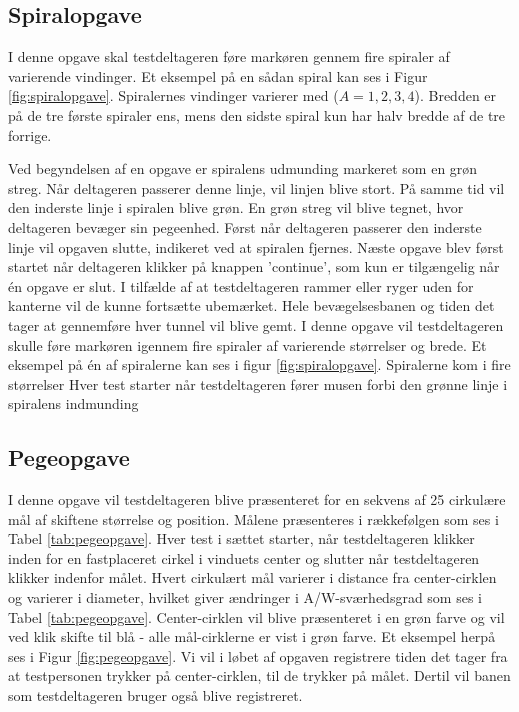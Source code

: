 \subsection*{Spiralopgave}
I denne opgave skal testdeltageren føre markøren gennem fire spiraler af varierende vindinger. Et eksempel på en sådan spiral kan ses i Figur \ref{fig:spiralopgave}. Spiralernes vindinger varierer med ($A = 1, 2, 3, 4$). Bredden er på de tre første spiraler ens, mens den sidste spiral kun har halv bredde af de tre forrige.

Ved begyndelsen af en opgave er spiralens udmunding markeret som en grøn streg. Når deltageren passerer denne linje, vil linjen blive stort. På samme tid vil den inderste linje i spiralen blive grøn. En grøn streg vil blive tegnet, hvor deltageren bevæger sin pegeenhed. Først når deltageren passerer den inderste linje vil opgaven slutte, indikeret ved at spiralen fjernes. Næste opgave blev først startet når deltageren klikker på knappen 'continue', som kun er tilgængelig når én opgave er slut. I tilfælde af at testdeltageren rammer eller ryger uden for kanterne vil de kunne fortsætte ubemærket. Hele bevægelsesbanen og tiden det tager at gennemføre hver tunnel vil blive gemt.
I denne opgave vil testdeltageren skulle føre markøren igennem fire spiraler af varierende størrelser og brede. Et eksempel på én af spiralerne kan ses i figur \ref{fig:spiralopgave}. Spiralerne kom i fire størrelser Hver test starter når testdeltageren fører musen forbi den grønne linje i spiralens indmunding

\subsection*{Pegeopgave}
I denne opgave vil testdeltageren blive præsenteret for en sekvens af 25 cirkulære mål af skiftene størrelse og position. Målene præsenteres i rækkefølgen som ses i Tabel \ref{tab:pegeopgave}. Hver test i sættet starter, når testdeltageren klikker inden for en fastplaceret cirkel i vinduets center og slutter når testdeltageren klikker indenfor målet. Hvert cirkulært mål varierer i distance fra center-cirklen og varierer i diameter, hvilket giver ændringer i A/W-sværhedsgrad som ses i Tabel \ref{tab:pegeopgave}. Center-cirklen vil  blive præsenteret i en grøn farve og vil ved klik skifte til blå - alle mål-cirklerne er vist i grøn farve. Et eksempel herpå ses i Figur \ref{fig:pegeopgave}. Vi vil i løbet af opgaven registrere tiden det tager fra at testpersonen trykker på center-cirklen, til de trykker på målet. Dertil vil banen som testdeltageren bruger også blive registreret.


